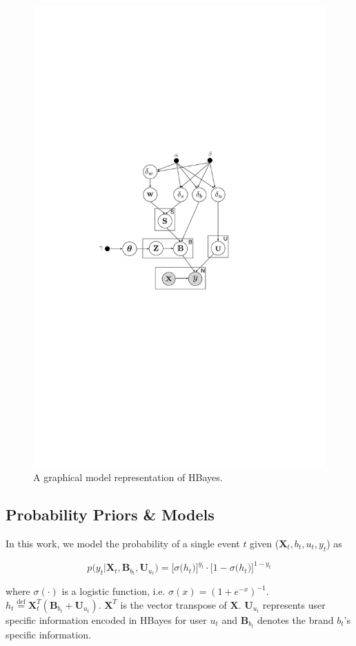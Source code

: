 \begin{figure}[htb]
\includegraphics[width=0.8\linewidth]{fig/model}
\caption{A graphical model representation of HBayes.}
\label{fig:model}
\end{figure}

\subsection{Probability Priors \& Models}

In this work, we model the probability of a single event $t$ given ($\mathbf{X}_t, b_t, u_t, y_t$) as 

\begin{equation}
\label{eq:sigmoid_prob}
p\big(y_t|\bm{X}_t,\bm{B}_{b_t},\bm{U}_{u_t} \big)= \Big[\sigma\big(h_t\big)\Big]^{y_t} \cdot \Big[1-\sigma\big(h_t\big)\Big]^{1-y_t}
\end{equation}

\noindent where $\sigma(\cdot)$ is a logistic function, i.e. $\sigma(x)=(1+e^{-x})^{-1}$. $h_{t}\overset{\mathrm{def}}=\bm{X}_t^T(\bm{B}_{b_t}+\bm{U}_{u_t})$. $\mathbf{X}^T$ is the vector transpose of $\mathbf{X}$. $\bm{U}_{u_t}$ represents user specific information encoded in HBayes for user $u_t$ and $\bm{B}_{b_t}$ denotes the brand $b_t$'s specific information.

